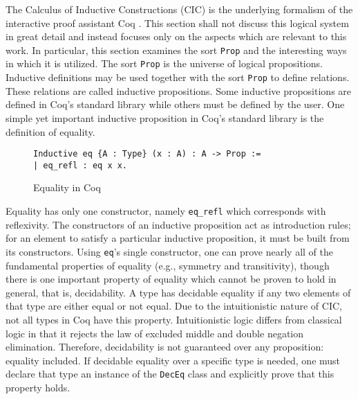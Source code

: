 The Calculus of Inductive Constructions (CIC) is the underlying formalism of the interactive proof assistant Coq \cite{CIC}. This section shall not discuss this logical system in great detail and instead focuses only on the aspects which are relevant to this work. In particular, this section examines the sort \verb|Prop| and the interesting ways in which it is utilized. The sort \verb|Prop| is the universe of logical propositions. Inductive definitions may be used together with the sort \verb|Prop| to define relations. These relations are called inductive propositions. Some inductive propositions are defined in Coq's standard library while others must be defined by the user. One simple yet important inductive proposition in Coq's standard library is the definition of equality. 
\begin{figure}[h]
\begin{lstlisting}[language=Coq]
Inductive eq {A : Type} (x : A) : A -> Prop :=
| eq_refl : eq x x.
\end{lstlisting}
\caption{Equality in Coq}
\end{figure}
Equality has only one constructor, namely \verb|eq_refl| which corresponds with reflexivity. The constructors of an inductive proposition act as introduction rules; for an element to satisfy a particular inductive proposition, it must be built from its constructors. Using \verb|eq|'s single constructor, one can prove nearly all of the fundamental properties of equality (e.g., symmetry and transitivity), though there is one important property of equality which cannot be proven to hold in general, that is, decidability. 
A type has decidable equality if any two elements of that type are either equal or not equal. Due to the intuitionistic nature of CIC, not all types in Coq have this property. Intuitionistic logic differs from classical logic in that it rejects the law of excluded middle and double negation elimination. Therefore, decidability is not guaranteed over any proposition: equality included. If decidable equality over a specific type is needed, one must declare that type an instance of the \verb|DecEq| class and explicitly prove that this property holds.

